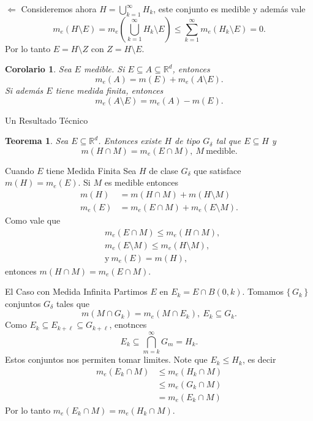 \documentclass[utf8]{beamer}
\theoremstyle{plain}
\newtheorem{Th}{Teorema}               %
\newtheorem{Cor}{Corolario}            %
\theoremstyle{definition}
\theoremstyle{remark}
\numberwithin{equation}{section}
\newcommand{\dl}{\delta}                %
\newcommand{\bR}{\mathbb{R}}    %
\newcommand{\set}[1]{\{\,#1\,\}}    %
\renewcommand{\l}{\ell}                   %
\renewcommand{\leq}{\leqslant}          %
\newcommand{\less}{\setminus}           %
\newcommand{\suck}{_{k=1}^\infty} %
\renewcommand{\.}{\Cdot}                %
\begin{document}
\begin{frame}{$\Leftarrow$}
Consideremos ahora $H=\bigcup\suck H_k$, este conjunto es medible y adem\'as vale
$$m_e(H\less E)=m_e\left(\bigcup\suck H_k\less E\right)\leq \sum\suck m_e(H_k\less E)=0.$$
Por lo tanto $E=H\less Z$ con $Z=H\less E$.
\begin{Cor}\label{cor:Caratheodory}
Sea $E$ medible. Si $E\subseteq A\subseteq\bR^d$, entonces
$$m_e(A)=m(E)+m_e(A\less E).$$
Si adem\'as $E$ tiene medida finita, entonces
$$m_e(A\less E)=m_e(A)-m(E).$$
\end{Cor}
\end{frame}

\begin{frame}{Un Resultado T\'ecnico}
\begin{Th}\label{th:elTecnico}
  Sea $E\subseteq\bR^d$. Entonces existe $H$ de tipo $G_\dl$ tal que $E\subseteq H$ y 
  $$m(H\cap M)=m_e(E\cap M),\ M\ \text{medible}.$$
\end{Th}
\end{frame}

\begin{frame}{Cuando $E$ tiene Medida Finita}
  Sea $H$ de clase $G_\dl$ que satisface $m(H)=m_e(E)$. Si $M$ es medible entonces
  \begin{align*}
    m(H)&=m(H\cap M)+m(H\less M)\\
    m_e(E)&=m_e(E\cap M)+m_e(E\less M).
  \end{align*}
  Como vale que 
  \begin{align*}
    &m_e(E\cap M)\leq m_e(H\cap M),\\
    &m_e(E\less M)\leq m_e(H\less M),\\
    &\text{y}\ m_e(E)=m(H),
  \end{align*}
  entonces $m(H\cap M)=m_e(E\cap M)$.
\end{frame}

\begin{frame}{El Caso con Medida Infinita}
Partimos $E$ en $E_k=E\cap B(0,k)$. Tomamos $\set{G_k}$ conjuntos $G_\dl$ tales que 
$$m(M\cap G_k)=m_e(M\cap E_k),\ E_k\subseteq G_k.$$
Como $E_k\subseteq E_{k+\l}\subseteq G_{k+\l}$, enotnces 
$$E_k\subseteq \bigcap_{m=k}^\infty G_m=H_k.$$
Estos conjuntos nos permiten tomar limites. Note que $E_k\leq H_k$, es decir 
\begin{align*}
  m_e(E_k\cap M)&\leq m_e(H_k\cap M)\\
  &\leq m_e(G_k\cap M)\\
&= m_e(E_k\cap M)
\end{align*}
Por lo tanto $m_e(E_k\cap M)=m_e(H_k\cap M)$.
\end{frame}
    
\end{document}
